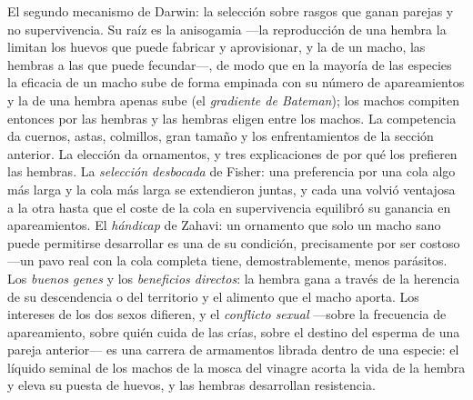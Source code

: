 \begin{definition}\label{def:b3:behavioural-ecology:sexual-selection}
El segundo mecanismo de Darwin: la selección sobre rasgos que ganan
parejas y no supervivencia. Su raíz es la anisogamia ---la reproducción
de una hembra la limitan los huevos que puede fabricar y aprovisionar, y
la de un macho, las hembras a las que puede fecundar---, de modo que en
la mayoría de las especies la eficacia de un macho sube de forma
empinada con su número de apareamientos y la de una hembra apenas sube
(el \emph{gradiente de Bateman}); los machos compiten entonces por las
hembras y las hembras eligen entre los machos. La competencia da
cuernos, astas, colmillos, gran tamaño y los enfrentamientos de la
sección anterior. La elección da ornamentos, y tres explicaciones de por
qué los prefieren las hembras. La \emph{selección desbocada} de Fisher:
una preferencia por una cola algo más larga y la cola más larga se
extendieron juntas, y cada una volvió ventajosa a la otra hasta que el
coste de la cola en supervivencia equilibró su ganancia en
apareamientos. El \emph{hándicap} de Zahavi: un ornamento que solo un
macho sano puede permitirse desarrollar es una  de su
condición, precisamente por ser costoso ---un pavo real con la cola
completa tiene, demostrablemente, menos parásitos. Los \emph{buenos
genes} y los \emph{beneficios directos}: la hembra gana a través de la
herencia de su descendencia o del territorio y el alimento que el macho
aporta. Los intereses de los dos sexos difieren, y el \emph{conflicto
sexual} ---sobre la frecuencia de apareamiento, sobre quién cuida de
las crías, sobre el destino del esperma de una pareja anterior--- es
una carrera de armamentos librada dentro de una especie: el líquido
seminal de los machos de la mosca del vinagre acorta la vida de la
hembra y eleva su puesta de huevos, y las hembras desarrollan
resistencia.
\end{definition}

